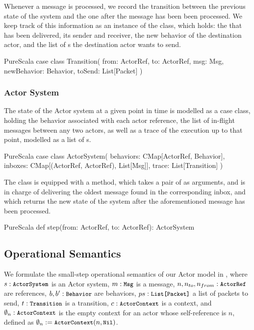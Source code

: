 Whenever a message is processed, we record the transition between the previous 
state of the system and the one after the message has been been processed. We keep 
track of this information as an instance of the  class, which 
holds: the  that has been delivered, its sender and receiver, the new 
behavior of the destination actor, and the list of s the destination 
actor wants to send.

\begin{ShortCode}{PureScala}
case class Transition(
  from: ActorRef,
  to: ActorRef,
  msg: Msg,
  newBehavior: Behavior,
  toSend: List[Packet]
)
\end{ShortCode}

\subsubsection{Actor System}

The state of the Actor system at a given point in time is modelled as a case class, 
holding the behavior associated with each actor reference, the list of in-flight messages 
between any two actors, as well as a trace of the execution up to that point, 
modelled as a list of s.

\begin{ShortCode}{PureScala}
case class ActorSystem(
  behaviors: CMap[ActorRef, Behavior],
  inboxes: CMap[(ActorRef, ActorRef), List[Msg]],
  trace: List[Transition]
)
\end{ShortCode}

The  class is equipped with a  method, which takes 
a pair of \ActorRef as arguments, and is in charge of delivering the oldest message 
found in the corresponding inbox, and which returns the new state of the system after 
the aforementioned message has been processed.

\begin{ShortCode}{PureScala}
def step(from: ActorRef, to: ActorRef): ActorSystem
\end{ShortCode}

\subsection{Operational Semantics}
\label{semantics}

We formulate the small-step operational semantics of our Actor model in 
, where $s: \texttt{\small{ActorSystem}}$ is an Actor system,
$m: \texttt{\small{Msg}}$ is a message,
$n, n_{to}, n_{from}: \texttt{\small{ActorRef}}$ are references,
$b, b': \texttt{\small{Behavior}}$ are behaviors,
$ps: \texttt{\small{List[Packet]}}$ a list of packets to send,
$t: \texttt{\small{Transition}}$ is a transition,
$c: \texttt{\small{ActorContext}}$ is a context,
and $\emptyset_n: \texttt{\small{ActorContext}}$ is the empty context for an actor whose
self-reference is $n$, defined as $\emptyset_n := \texttt{\small{ActorContext}}(n, \texttt{\small{Nil}})$.

